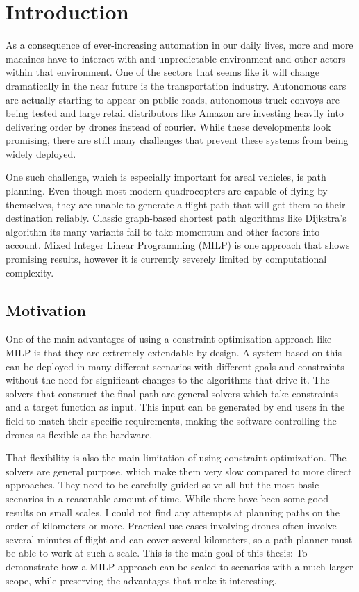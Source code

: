 \section{Introduction}
As a consequence of ever-increasing automation in our daily lives, more and more machines have to interact with and unpredictable environment and other actors within that environment. One of the sectors that seems like it will change dramatically in the near future is the transportation industry. Autonomous cars are actually starting to appear on public roads, autonomous truck convoys are being tested and large retail distributors like Amazon are investing heavily into delivering order by drones instead of courier. While these developments look promising, there are still many challenges that prevent these systems from being widely deployed.
\par
One such challenge, which is especially important for areal vehicles, is path planning. Even though most modern quadrocopters are capable of flying by themselves, they are unable to generate a flight path that will get them to their destination reliably. Classic graph-based shortest path algorithms like Dijkstra's algorithm its many variants fail to take momentum and other factors into account. Mixed Integer Linear Programming (MILP) is one approach that shows promising results, however it is currently severely limited by computational complexity.



\subsection{Motivation }
One of the main advantages of using a constraint optimization approach like MILP is that they are extremely extendable by design. A system based on this can be deployed in many different scenarios with different goals and constraints without the need for significant changes to the algorithms that drive it. The solvers that construct the final path are general solvers which take constraints and a target function as input. This input can be generated by end users in the field to match their specific requirements, making the software controlling the drones as flexible as the hardware.
\par
That flexibility is also the main limitation of using constraint optimization. The solvers are general purpose, which make them very slow compared to more direct approaches. They need to be carefully guided solve all but the most basic scenarios in a reasonable amount of time. While there have been some good results on small scales, I could not find any attempts at planning paths on the order of kilometers or more. Practical use cases involving drones often involve several minutes of flight and can cover several kilometers, so a path planner must be able to work at such a scale. This is the main goal of this thesis: To demonstrate how a MILP approach can be scaled to scenarios with a much larger scope, while preserving the advantages that make it interesting.
